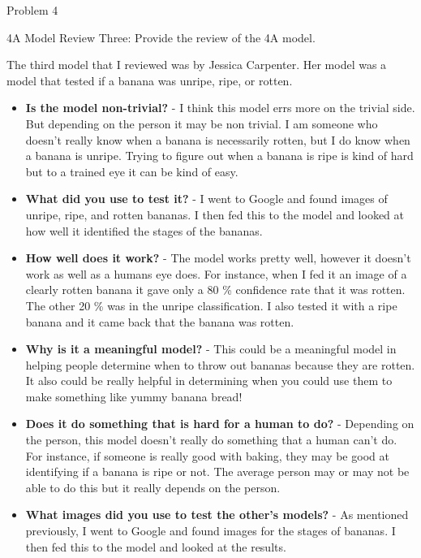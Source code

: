 \begin{problem}{Problem 4}
    \clearpage
    \begin{statement}{4A Model Review Three:}
        Provide the review of the 4A model.
    \end{statement}
    
    \begin{highlight}[Solution]
        The third model that I reviewed was by Jessica Carpenter. Her model was a model that tested if a banana was unripe, ripe, or rotten.

        \begin{itemize}
            \item \textbf{Is the model non-trivial?} - I think this model errs more on the trivial side. But depending on the person it may be non trivial. I am someone who doesn't really know 
            when a banana is necessarily rotten, but I do know when a banana is unripe. Trying to figure out when a banana is ripe is kind of hard but to a trained eye it can be kind of easy.
            \item \textbf{What did you use to test it?} - I went to Google and found images of unripe, ripe, and rotten bananas. I then fed this to the model and looked at how well it identified
            the stages of the bananas.
            \item \textbf{How well does it work?} - The model works pretty well, however it doesn't work as well as a humans eye does. For instance, when I fed it an image of a clearly rotten banana
            it gave only a 80 \% confidence rate that it was rotten. The other 20 \% was in the unripe classification. I also tested it with a ripe banana and it came back that the banana was rotten.
            \item \textbf{Why is it a meaningful model?} - This could be a meaningful model in helping people determine when to throw out bananas because they are rotten. It also could be really helpful
            in determining when you could use them to make something like yummy banana bread!
            \item \textbf{Does it do something that is hard for a human to do?} - Depending on the person, this model doesn't really do something that a human can't do. For instance, if someone is
            really good with baking, they may be good at identifying if a banana is ripe or not. The average person may or may not be able to do this but it really depends on the person.
            \item \textbf{What images did you use to test the other's models?} - As mentioned previously, I went to Google and found images for the stages of bananas. I then fed this to the model
            and looked at the results.
        \end{itemize}
    \end{highlight}
\end{problem}